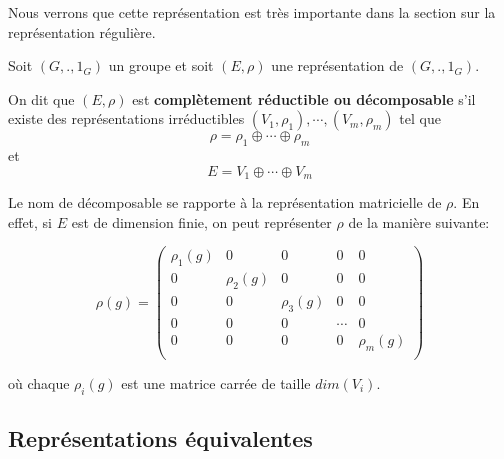 Nous verrons que cette représentation est très importante dans la section sur la
représentation régulière.

\begin{definition}
	Soit $(G, ., 1_{G})$ un groupe et soit $(E, \rho)$
	une représentation de $(G, ., 1_{G})$.

	On dit que $(E, \rho)$ est \textbf{complètement
	réductible ou décomposable} s'il existe des représentations irréductibles $(V_{1},
	\rho_{1}), \cdots, (V_{m}, \rho_{m})$ tel que
	\begin{equation}
		\rho = \rho_{1} \oplus \cdots \oplus \rho_{m}
	\end{equation}
	et
	\begin{equation}
		E = V_{1} \oplus \cdots \oplus V_{m}
	\end{equation}
\end{definition}

Le nom de décomposable se rapporte à la représentation matricielle de $\rho$.
En effet, si $E$ est de dimension finie, on peut représenter $\rho$ de la
manière suivante:

\begin{equation}
	\rho(g) =
	\begin{pmatrix}
		\rho_{1}(g)	& 0				&	0			& 0			&	0 \\
		0			& \rho_{2}(g)	&	0			& 0			&	0 \\
		0			& 0				&	\rho_{3}(g)	& 0			&	0 \\
		0			& 0				&	0			& \cdots	&	0 \\
		0			& 0				&	0			& 0			&	\rho_{m}(g) \\
	\end{pmatrix}
\end{equation}

où chaque $\rho_{i}(g)$ est une matrice carrée de taille $dim(V_{i})$.

\subsection{Représentations équivalentes}


